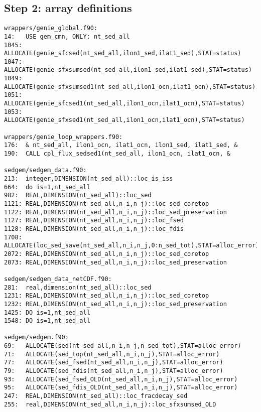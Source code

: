 \documentclass[a4paper,10pt,article]{memoir}
\begin{document}
\subsection{Step 2: array definitions}

\newpage
\begin{small}
\begin{verbatim}
wrappers/genie_global.f90:
14:   USE gem_cmn, ONLY: nt_sed_all
1045: ALLOCATE(genie_sfcsed(nt_sed_all,ilon1_sed,ilat1_sed),STAT=status)
1047: ALLOCATE(genie_sfxsumsed(nt_sed_all,ilon1_sed,ilat1_sed),STAT=status)
1049: ALLOCATE(genie_sfxsumsed1(nt_sed_all,ilon1_ocn,ilat1_ocn),STAT=status)
1051: ALLOCATE(genie_sfcsed1(nt_sed_all,ilon1_ocn,ilat1_ocn),STAT=status)
1053: ALLOCATE(genie_sfxsed1(nt_sed_all,ilon1_ocn,ilat1_ocn),STAT=status)

wrappers/genie_loop_wrappers.f90:
176:  & nt_sed_all, ilon1_ocn, ilat1_ocn, ilon1_sed, ilat1_sed, &
190:  CALL cpl_flux_sedsed1(nt_sed_all, ilon1_ocn, ilat1_ocn, &

sedgem/sedgem_data.f90:
213:  integer,DIMENSION(nt_sed_all)::loc_is_iss
664:  do is=1,nt_sed_all
982:  REAL,DIMENSION(nt_sed_all)::loc_sed
1121: REAL,DIMENSION(nt_sed_all,n_i,n_j)::loc_sed_coretop
1122: REAL,DIMENSION(nt_sed_all,n_i,n_j)::loc_sed_preservation
1127: REAL,DIMENSION(nt_sed_all,n_i,n_j)::loc_fsed
1128: REAL,DIMENSION(nt_sed_all,n_i,n_j)::loc_fdis
1708: ALLOCATE(loc_sed_save(nt_sed_all,n_i,n_j,0:n_sed_tot),STAT=alloc_error)
2072: REAL,DIMENSION(nt_sed_all,n_i,n_j)::loc_sed_coretop
2073: REAL,DIMENSION(nt_sed_all,n_i,n_j)::loc_sed_preservation

sedgem/sedgem_data_netCDF.f90:
281:  real,dimension(nt_sed_all)::loc_sed
1231: REAL,DIMENSION(nt_sed_all,n_i,n_j)::loc_sed_coretop
1232: REAL,DIMENSION(nt_sed_all,n_i,n_j)::loc_sed_preservation
1425: DO is=1,nt_sed_all
1548: DO is=1,nt_sed_all

sedgem/sedgem.f90:
69:   ALLOCATE(sed(nt_sed_all,n_i,n_j,n_sed_tot),STAT=alloc_error)
71:   ALLOCATE(sed_top(nt_sed_all,n_i,n_j),STAT=alloc_error)
77:   ALLOCATE(sed_fsed(nt_sed_all,n_i,n_j),STAT=alloc_error)
79:   ALLOCATE(sed_fdis(nt_sed_all,n_i,n_j),STAT=alloc_error)
93:   ALLOCATE(sed_fsed_OLD(nt_sed_all,n_i,n_j),STAT=alloc_error)
95:   ALLOCATE(sed_fdis_OLD(nt_sed_all,n_i,n_j),STAT=alloc_error)
247:  REAL,DIMENSION(nt_sed_all)::loc_fracdecay_sed
255:  real,DIMENSION(nt_sed_all,n_i,n_j)::loc_sfxsumsed_OLD


\end{verbatim}
\end{small}
\end{document}
